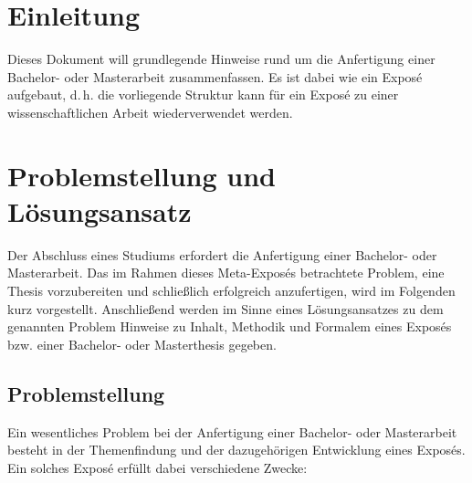 \documentclass[11pt]{scrartcl}
\newcommand{\qto}[1]{\glqq #1\grqq}				%
\newcommand{\dH}{\mbox{d.\,h.}\xspace} %
\newcommand{\bzw}{bzw.\xspace}
\begin{document}
\section{Einleitung}

Dieses Dokument will grundlegende Hinweise rund um die Anfertigung einer Bachelor- oder Masterarbeit zusammenfassen. Es ist dabei wie ein Exposé aufgebaut, \dH die vorliegende Struktur kann für ein Exposé zu einer wissenschaftlichen Arbeit wiederverwendet werden. 


\section{\label{sec:problem_loesung}Problemstellung und Lösungsansatz}
 
Der Abschluss eines Studiums erfordert die Anfertigung einer Bachelor- oder Masterarbeit. Das im Rahmen dieses \qto{Meta-Exposés} betrachtete Problem, eine Thesis vorzubereiten und schließlich erfolgreich anzufertigen, wird im Folgenden kurz vorgestellt. Anschließend werden im Sinne eines Lösungsansatzes zu dem genannten Problem Hinweise zu Inhalt, Methodik und Formalem eines Exposés \bzw einer Bachelor- oder Masterthesis gegeben.



\subsection{Problemstellung}

Ein wesentliches Problem bei der Anfertigung einer Bachelor- oder Masterarbeit besteht in der Themenfindung und der dazugehörigen Entwicklung eines Exposés. Ein solches Exposé erfüllt dabei verschiedene Zwecke:
\end{document}
